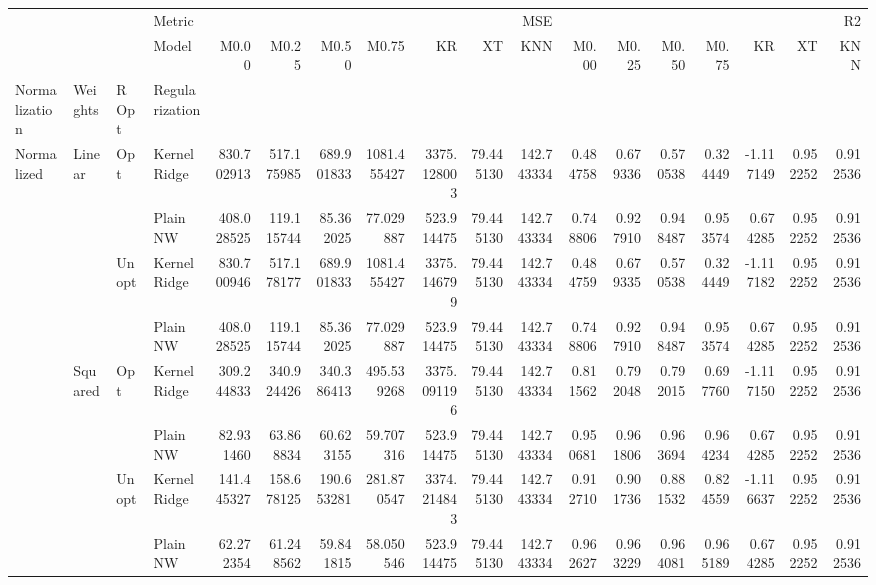 \begin{tabular}{llllrrrrrrrrrrrrrr}
\toprule
 &  &  & Metric & \multicolumn{7}{r}{MSE} & \multicolumn{7}{r}{R2} \\
 &  &  & Model & M0.00 & M0.25 & M0.50 & M0.75 & KR & XT & KNN & M0.00 & M0.25 & M0.50 & M0.75 & KR & XT & KNN \\
Normalization & Weights & R Opt & Regularization &  &  &  &  &  &  &  &  &  &  &  &  &  &  \\
\midrule
\multirow[t]{8}{*}{Normalized} & \multirow[t]{4}{*}{Linear} & \multirow[t]{2}{*}{Opt} & KernelRidge & 830.702913 & 517.175985 & 689.901833 & 1081.455427 & 3375.128003 & 79.445130 & 142.743334 & 0.484758 & 0.679336 & 0.570538 & 0.324449 & -1.117149 & 0.952252 & 0.912536 \\
 &  &  & Plain NW & 408.028525 & 119.115744 & 85.362025 & 77.029887 & 523.914475 & 79.445130 & 142.743334 & 0.748806 & 0.927910 & 0.948487 & 0.953574 & 0.674285 & 0.952252 & 0.912536 \\
\cline{3-18}
 &  & \multirow[t]{2}{*}{Unopt} & KernelRidge & 830.700946 & 517.178177 & 689.901833 & 1081.455427 & 3375.146799 & 79.445130 & 142.743334 & 0.484759 & 0.679335 & 0.570538 & 0.324449 & -1.117182 & 0.952252 & 0.912536 \\
 &  &  & Plain NW & 408.028525 & 119.115744 & 85.362025 & 77.029887 & 523.914475 & 79.445130 & 142.743334 & 0.748806 & 0.927910 & 0.948487 & 0.953574 & 0.674285 & 0.952252 & 0.912536 \\
\cline{2-18} \cline{3-18}
 & \multirow[t]{4}{*}{Squared} & \multirow[t]{2}{*}{Opt} & KernelRidge & 309.244833 & 340.924426 & 340.386413 & 495.539268 & 3375.091196 & 79.445130 & 142.743334 & 0.811562 & 0.792048 & 0.792015 & 0.697760 & -1.117150 & 0.952252 & 0.912536 \\
 &  &  & Plain NW & 82.931460 & 63.868834 & 60.623155 & 59.707316 & 523.914475 & 79.445130 & 142.743334 & 0.950681 & 0.961806 & 0.963694 & 0.964234 & 0.674285 & 0.952252 & 0.912536 \\
\cline{3-18}
 &  & \multirow[t]{2}{*}{Unopt} & KernelRidge & 141.445327 & 158.678125 & 190.653281 & 281.870547 & 3374.214843 & 79.445130 & 142.743334 & 0.912710 & 0.901736 & 0.881532 & 0.824559 & -1.116637 & 0.952252 & 0.912536 \\
 &  &  & Plain NW & 62.272354 & 61.248562 & 59.841815 & 58.050546 & 523.914475 & 79.445130 & 142.743334 & 0.962627 & 0.963229 & 0.964081 & 0.965189 & 0.674285 & 0.952252 & 0.912536 \\
\cline{1-18} \cline{2-18} \cline{3-18}
\bottomrule
\end{tabular}
